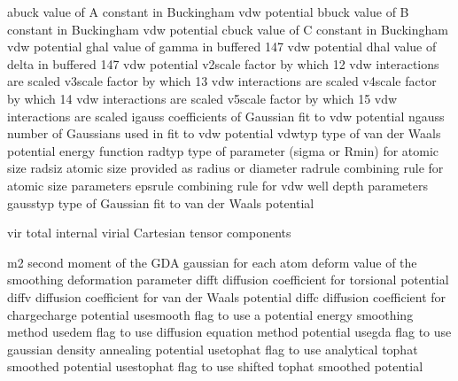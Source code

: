 \documentclass[letterpaper,11pt,english]{sphinxmanual}
\begin{document}

\begin{sphinxVerbatim}[commandchars=\\\{\}]
abuck           value of \PYGZdq{}A\PYGZdq{} constant in Buckingham vdw potential
bbuck           value of \PYGZdq{}B\PYGZdq{} constant in Buckingham vdw potential
cbuck           value of \PYGZdq{}C\PYGZdq{} constant in Buckingham vdw potential
ghal            value of \PYGZdq{}gamma\PYGZdq{} in buffered 14\PYGZhy{}7 vdw potential
dhal            value of \PYGZdq{}delta\PYGZdq{} in buffered 14\PYGZhy{}7 vdw potential
v2scale         factor by which 1\PYGZhy{}2 vdw interactions are scaled
v3scale         factor by which 1\PYGZhy{}3 vdw interactions are scaled
v4scale         factor by which 1\PYGZhy{}4 vdw interactions are scaled
v5scale         factor by which 1\PYGZhy{}5 vdw interactions are scaled
igauss          coefficients of Gaussian fit to vdw potential
ngauss          number of Gaussians used in fit to vdw potential
vdwtyp          type of van der Waals potential energy function
radtyp          type of parameter (sigma or R\PYGZhy{}min) for atomic size
radsiz          atomic size provided as radius or diameter
radrule         combining rule for atomic size parameters
epsrule         combining rule for vdw well depth parameters
gausstyp        type of Gaussian fit to van der Waals potential
\end{sphinxVerbatim}


\begin{sphinxVerbatim}[commandchars=\\\{\}]
vir             total internal virial Cartesian tensor components
\end{sphinxVerbatim}


\begin{sphinxVerbatim}[commandchars=\\\{\}]
m2              second moment of the GDA gaussian for each atom
deform          value of the smoothing deformation parameter
difft           diffusion coefficient for torsional potential
diffv           diffusion coefficient for van der Waals potential
diffc           diffusion coefficient for charge\PYGZhy{}charge potential
use\PYGZus{}smooth      flag to use a potential energy smoothing method
use\PYGZus{}dem         flag to use diffusion equation method potential
use\PYGZus{}gda         flag to use gaussian density annealing potential
use\PYGZus{}tophat      flag to use analytical tophat smoothed potential
use\PYGZus{}stophat     flag to use shifted tophat smoothed potential
\end{sphinxVerbatim}
\end{document}
